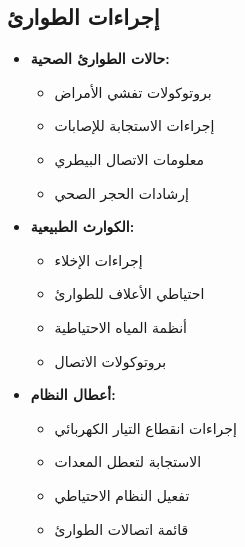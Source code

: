 \subsection{إجراءات الطوارئ}
\begin{itemize}
    \item \textbf{حالات الطوارئ الصحية:}
    \begin{itemize}
        \item بروتوكولات تفشي الأمراض
        \item إجراءات الاستجابة للإصابات
        \item معلومات الاتصال البيطري
        \item إرشادات الحجر الصحي
    \end{itemize}
    
    \item \textbf{الكوارث الطبيعية:}
    \begin{itemize}
        \item إجراءات الإخلاء
        \item احتياطي الأعلاف للطوارئ
        \item أنظمة المياه الاحتياطية
        \item بروتوكولات الاتصال
    \end{itemize}
    
    \item \textbf{أعطال النظام:}
    \begin{itemize}
        \item إجراءات انقطاع التيار الكهربائي
        \item الاستجابة لتعطل المعدات
        \item تفعيل النظام الاحتياطي
        \item قائمة اتصالات الطوارئ
    \end{itemize}
\end{itemize}

